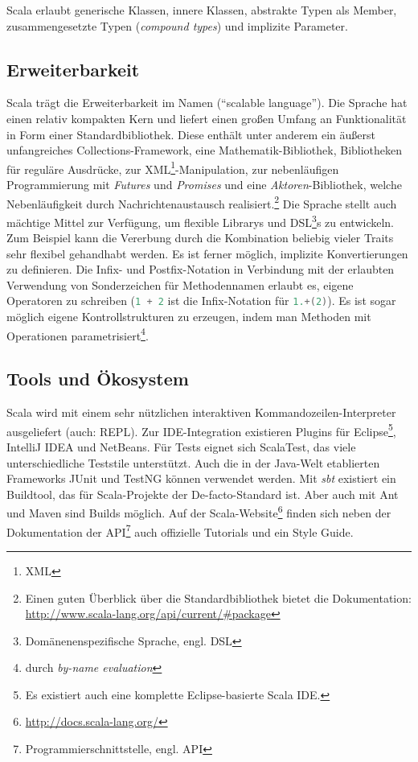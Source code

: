 \documentclass[a4paper, 12pt, hidelinks, listof=totoc, listoftables=totoc, bibliography=totoc]{scrreprt}
\newcommand{\scala}[1]{\lstinline[language=Scala, style=inline]|#1|}
\begin{document}
Scala erlaubt generische Klassen, innere Klassen, abstrakte Typen als Member, zusammengesetzte Typen (\emph{compound types}) und implizite Parameter. \cite[S. 16 ff., S. 205 ff.]{odersky2008.PIS}\cite[S. 113 ff.]{piepmeyer2010.GFP}\cite{scala-lang2011.CSS}

\subsection{Erweiterbarkeit}

Scala trägt die Erweiterbarkeit im Namen ("`scalable language"').
Die Sprache hat einen relativ kompakten Kern und liefert einen großen Umfang an Funktionalität in Form einer Standardbibliothek. Diese enthält unter anderem ein äußerst unfangreiches Collections-Framework, eine Mathematik-Bibliothek, Bibliotheken für reguläre Ausdrücke, zur XML\footnote{\ac{XML}}-Manipulation, zur nebenläufigen Programmierung mit \emph{Futures} und \emph{Promises} und eine \emph{Aktoren}-Bibliothek, welche Nebenläufigkeit durch Nachrichtenaustausch realisiert.\footnote{Einen guten Überblick über die Standardbibliothek bietet die Dokumentation: \url{http://www.scala-lang.org/api/current/\#package}} Die Sprache stellt auch mächtige Mittel zur Verfügung, um flexible Librarys und DSL\footnote{Domänenenspezifische Sprache, engl. \ac{DSL}}s zu entwickeln. Zum Beispiel kann die Vererbung durch die Kombination beliebig vieler Traits sehr flexibel gehandhabt werden. Es ist ferner möglich, implizite Konvertierungen zu definieren. Die Infix- und Postfix-Notation in Verbindung mit der erlaubten Verwendung von Sonderzeichen für Methodennamen erlaubt es, eigene Operatoren zu schreiben \linebreak(\mbox{\scala{1 + 2}} ist die Infix-Notation für \scala{1.+(2)}). Es ist sogar möglich eigene Kontrollstrukturen zu erzeugen, indem man Methoden mit Operationen parametrisiert\footnote{durch \emph{by-name evaluation}}. \cite[S. 4 ff.]{odersky2008.PIS}

\subsection{Tools und Ökosystem}

Scala wird mit einem sehr nützlichen interaktiven Kommandozeilen-Interpreter ausgeliefert (auch: \ac{REPL}). Zur IDE-Integration existieren Plugins für Eclipse\footnote{Es existiert auch eine komplette Eclipse-basierte Scala IDE.}, IntelliJ IDEA und NetBeans. Für Tests eignet sich ScalaTest, das viele unterschiedliche Teststile unterstützt. Auch die in der Java-Welt etablierten Frameworks JUnit und TestNG können verwendet werden. Mit \emph{sbt} existiert ein Buildtool, das für Scala-Projekte der De-facto-Standard ist. Aber auch mit Ant und Maven sind Builds möglich. Auf der Scala-Website\footnote{\url{http://docs.scala-lang.org/}} finden sich neben der Dokumentation der API\footnote{Programmierschnittstelle, engl. \ac{API}} auch offizielle Tutorials und ein Style Guide.
\end{document}
